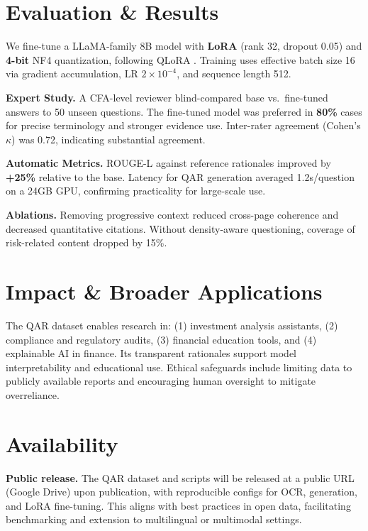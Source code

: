 \documentclass[sigconf,authordraft,anonymous]{acmart}
\begin{document}
\section{Evaluation \& Results}
We fine-tune a LLaMA-family 8B model with \textbf{LoRA} (rank 32, dropout 0.05) and \textbf{4-bit} NF4 quantization, following QLoRA \cite{dettmers2023qloraefficientfinetuningquantized}. Training uses effective batch size 16 via gradient accumulation, LR $2\!\times\!10^{-4}$, and sequence length 512.

\textbf{Expert Study.} A CFA-level reviewer blind-compared base vs.\ fine-tuned answers to 50 unseen questions. The fine-tuned model was preferred in \textbf{80\%} cases for precise terminology and stronger evidence use. Inter-rater agreement (Cohen’s $\kappa$) was 0.72, indicating substantial agreement.

\textbf{Automatic Metrics.} ROUGE-L against reference rationales improved by \textbf{+25\%} relative to the base. Latency for QAR generation averaged 1.2s/question on a 24GB GPU, confirming practicality for large-scale use.

\textbf{Ablations.} Removing progressive context reduced cross-page coherence and decreased quantitative citations. Without density-aware questioning, coverage of risk-related content dropped by 15\%.

\section{Impact \& Broader Applications}
The QAR dataset enables research in: (1) investment analysis assistants, (2) compliance and regulatory audits, (3) financial education tools, and (4) explainable AI in finance. Its transparent rationales support model interpretability and educational use. Ethical safeguards include limiting data to publicly available reports and encouraging human oversight to mitigate overreliance. 

\section{Availability}
\textbf{Public release.} The QAR dataset and scripts will be released at a public URL (Google Drive) upon publication, with reproducible configs for OCR, generation, and LoRA fine-tuning. This aligns with best practices in open data, facilitating benchmarking and extension to multilingual or multimodal settings.








\appendix
\end{document}
